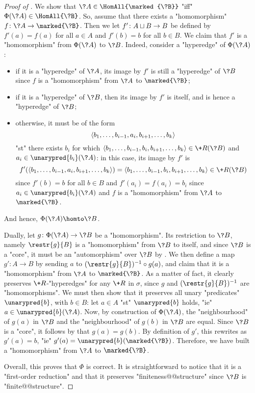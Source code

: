 \begin{proof}[Proof of ]
	We show that $\?A \in \HomAll{\marked{\?B}}$ "iff" $\Phi(\?A) \in \HomAll{\?B}$.
	So, assume that there exists a "homomorphism" $f\colon \?A \to \marked{\?B}$.
	Then we let $f'\colon A \sqcup B \to B$ be defined by $f'(a) = f(a)$ for all $a\in A$ and
	$f'(b) = b$ for all $b \in B$. We claim that $f'$ is a "homomorphism" from
	$\Phi(\?A)$ to $\?B$. Indeed, consider a "hyperedge" of $\Phi(\?A)$:
	\begin{itemize}
		\item if it is a "hyperedge" of $\?A$, its image by $f'$ is still a "hyperedge"
			of $\?B$ since $f$ is a "homomorphism" from $\?A$ to $\marked{\?B}$;
		\item if it is a "hyperedge" of $\?B$, then its image by $f'$ is itself, and is hence
			a "hyperedge" of $\?B$;
		\item otherwise, it must be of the form 
			\[\langle b_1,\hdots,b_{i-1}, a_i, b_{i+1},\hdots,b_k\rangle\]
			"st" there exists $b_i$ for which
			$\tup{b_1,\hdots,b_{i-1}, b_i, b_{i+1},\hdots,b_k} \in \+R(\?B)$
			and $a_i \in \unarypred{b_i}(\?A)$:
			in this case, its image by $f'$ is 
			\[f'(\tup{b_1,\hdots,b_{i-1}, a_i, b_{i+1},\hdots,b_k})
			= \tup{b_1,\hdots,b_{i-1}, b_i, b_{i+1},\hdots,b_k} \in \+R(\?B)\]
			since $f'(b) = b$ for all $b\in B$ and $f'(a_i) = f(a_i) = b_i$ since
			$a_i \in \unarypred{b_i}(\?A)$ and $f$ is a "homomorphism" from
			$\?A$ to $\marked{\?B}$.
	\end{itemize}
	And hence, $\Phi(\?A) \homto \?B$.

	Dually, let $g\colon \Phi(\?A) \to \?B$ be a "homomorphism".
	Its restriction to $\?B$, namely $\restr{g}{B}$ is a "homomorphism" from $\?B$
	to itself, and since $\?B$ is a "core", it must be an "automorphism" over $\?B$
	by .
	We then define a map $g' \colon A \to B$ by sending
	$a$ to $(\restr{g}{B})^{-1}\circ g(a)$, and claim that it is a "homomorphism"
	from $\?A$ to $\marked{\?B}$. As a matter of fact, it clearly preserves $\+R$-"hyperedges"
	for any $\+R$ in $\sigma$, since $g$ and $(\restr{g}{B})^{-1}$ are "homomorphisms".
	We must then show that it preserves all unary "predicates" $\unarypred{b}$, with $b\in B$:
	let $a \in A$ "st" $\unarypred{b}$ holds, "ie" $a \in \unarypred{b}(\?A)$.
	Now, by construction of $\Phi(\?A)$, the "neighbourhood" of $g(a)$ in $\?B$
	and the "neighbourhood" of $g(b)$ in $\?B$ are equal.
	Since $\?B$ is a "core", it follows by  that $g(a) = g(b)$.
	By definition of $g'$, this rewrites as $g'(a) = b$, "ie" $g'(a) = \unarypred{b}(\marked{\?B})$.
	Therefore, we have built a "homomorphism" from $\?A$ to $\marked{\?B}$.

	Overall, this proves that $\Phi$ is correct. It is straightforward to notice that
	it is a "first-order reduction" and that it preserves "finiteness@@structure" since $\?B$
	is "finite@@structure".
\end{proof}



